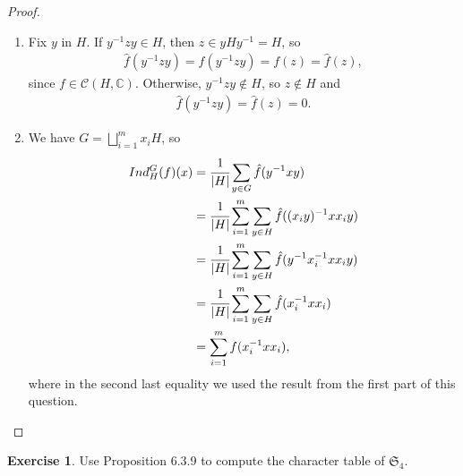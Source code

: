 \documentclass[8pt]{extarticle}
\newcommand{\abs}[1]{|#1|}
\newcommand{\C}{\mathbb{C}}
\newcommand{\<}{\langle}
\renewcommand{\>}{\rangle}
\theoremstyle{definition}
\newtheorem{exercise}{Exercise}
\begin{document}
\begin{proof}
  \begin{enumerate}
  \item
    Fix $y$ in $H$. If $y^{-1}zy \in H$, then $ z \in yHy^{-1}=H$, so
    \begin{align*}
      \hat f(y^{-1}zy) = f(y^{-1}zy) = f(z) = \hat f (z),
    \end{align*}
    since $f \in \mathcal{C}(H,\C)$. Otherwise, $y^{-1}zy \not \in H$, so $z \not \in H$ and
    \begin{align*}
      \hat f(y^{-1}zy) = \hat f(z) = 0.
    \end{align*}
  \item
    We have $G = \bigsqcup\limits_{i=1}^m x_iH$, so
    \begin{align*}
      Ind_H^G(f)(x)
      &=
      \cfrac{1}{\abs{H}} \sum\limits_{y \in G}\hat f (y^{-1}xy) \\
      &=
      \cfrac{1}{\abs{H}} \sum\limits_{i=1}^m \sum\limits_{y \in H}\hat f ((x_i y)^{-1}x x_i y) \\
      &= 
      \cfrac{1}{\abs{H}} \sum\limits_{i=1}^m \sum\limits_{y \in H}\hat f (y^{-1} x_i^{-1}x x_i y) \\
      &=
      \cfrac{1}{\abs{H}} \sum\limits_{i=1}^m \sum\limits_{y \in H}\hat f (x_i^{-1}x x_i) \\
      &=
      \sum\limits_{i=1}^m f (x_i^{-1}x x_i),                         
    \end{align*}
    where in the second last equality we used the result from the first part of this question.
  \end{enumerate}
\end{proof}
\newpage
\begin{exercise}
  Use Proposition 6.3.9 to compute the character table of $\mathfrak{S}_4$.
\end{exercise}
\end{document}
